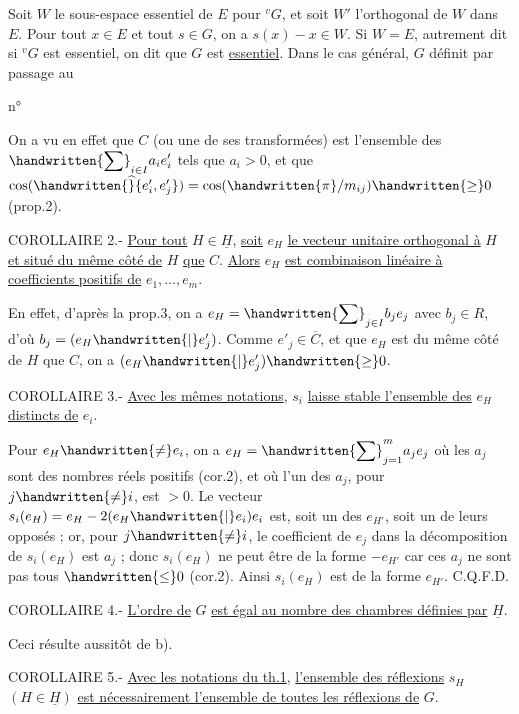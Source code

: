 Soit $W$ le sous-espace essentiel de $E$ pour ${}^vG$, et soit $W'$ l'orthogonal de $W$ dans $E$. Pour tout $x\in E$ et tout $s\in G$, on a $s(x)-x\in W$. Si $W=E$, autrement dit si ${}^vG$ est essentiel, on dit que $G$ est \uline{essentiel}. Dans le cas général, $G$ définit par passage au

\begin{flushright}n°\end{flushright}
On a vu en effet que $C$ (ou une de ses transformées) est l'ensemble des $\displaystyle\handwritten{\sum}_{i\in I}a_i e'_i$ tels que $a_i>0$, et que $\cos(\handwritten{\widehat}{e'_i,e'_j})=\cos(\handwritten{\pi}/m_{ij})\handwritten{\geq}0$ (prop.2).

COROLLAIRE 2.- \uline{Pour tout} $H\in\underline{H}$, \uline{soit} $e_H$ \uline{le vecteur unitaire orthogonal à} $H$ \uline{et situé du même côté de} $H$ \uline{que} $C$. \uline{Alors} $e_H$ \uline{est combinaison linéaire à coefficients positifs de} $e_1,\ldots,e_m$.

En effet, d'après la prop.3, on a $\displaystyle e_H=\handwritten{\sum}_{j\in I}b_j e_j$ avec $b_j\in R$, d'où $b_j=(e_H\handwritten{|}e'_j)$. Comme $e'_j\in\overline{C}$, et que $e_H$ est du même côté de $H$ que $C$, on a $(e_H\handwritten{|}e'_j)\handwritten{\geq}0$.

COROLLAIRE 3.- \uline{Avec les mêmes notations}, $s_i$ \uline{laisse stable l'ensemble des} $e_H$ \uline{distincts de} $e_i$.

Pour $e_H\handwritten{\ne}e_i$, on a $\displaystyle e_H=\handwritten{\sum}_{j=1}^m a_j e_j$ où les $a_j$ sont des nombres réels positifs (cor.2), et où l'un des $a_j$, pour $j\handwritten{\ne}i$, est $>0$. Le vecteur $s_i(e_H)=e_H-2(e_H\handwritten{|}e_i)e_i$ est, soit un des $e_{H'}$, soit un de leurs opposés ; or, pour $j\handwritten{\ne}i$, le coefficient de $e_j$ dans la décomposition de $s_i(e_H)$ est $a_j$ ; donc $s_i(e_H)$ ne peut être de la forme $-e_{H'}$ car ces $a_j$ ne sont pas tous $\handwritten{\leq}0$ (cor.2). Ainsi $s_i(e_H)$ est de la forme $e_{H'}$. C.Q.F.D.

COROLLAIRE 4.- \uline{L'ordre de} $G$ \uline{est égal au nombre des chambres définies par} $\underline{H}$.

Ceci résulte aussitôt de b).

COROLLAIRE 5.- \uline{Avec les notations du th.1}, \uline{l'ensemble des réflexions} $s_H$ $(H\in\underline{H})$ \uline{est nécessairement l'ensemble de toutes les réflexions de} $G$.

